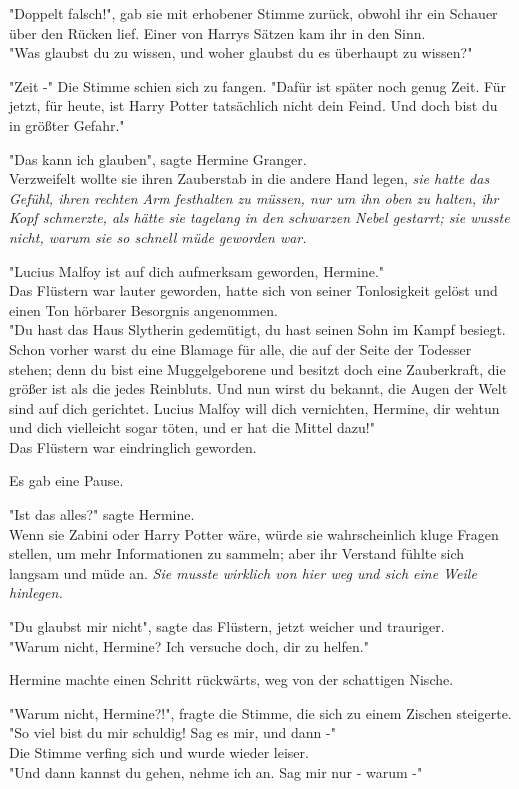 {"Doppelt falsch!", gab sie mit erhobener Stimme zurück, obwohl ihr ein Schauer über den Rücken lief. Einer von Harrys Sätzen kam ihr in den Sinn.\\ "Was glaubst du zu wissen, und woher glaubst du es überhaupt zu wissen?"

"Zeit -" Die Stimme schien sich zu fangen. "Dafür ist später noch genug Zeit. Für jetzt, für heute, ist Harry Potter tatsächlich nicht dein Feind. Und doch bist du in größter Gefahr."

"Das kann ich glauben", sagte Hermine Granger.\\ Verzweifelt wollte sie ihren Zauberstab in die andere Hand legen, \emph{sie hatte das Gefühl, ihren rechten Arm festhalten zu müssen, nur um ihn oben zu halten, ihr Kopf schmerzte, als hätte sie tagelang in den schwarzen Nebel gestarrt; sie wusste nicht, warum sie so schnell müde geworden war.}

"Lucius Malfoy ist auf dich aufmerksam geworden, Hermine."\\ Das Flüstern war lauter geworden, hatte sich von seiner Tonlosigkeit gelöst und einen Ton hörbarer Besorgnis angenommen.\\ "Du hast das Haus Slytherin gedemütigt, du hast seinen Sohn im Kampf besiegt. Schon vorher warst du eine Blamage für alle, die auf der Seite der Todesser stehen; denn du bist eine Muggelgeborene und besitzt doch eine Zauberkraft, die größer ist als die jedes Reinbluts. Und nun wirst du bekannt, die Augen der Welt sind auf dich gerichtet. Lucius Malfoy will dich vernichten, Hermine, dir wehtun und dich vielleicht sogar töten, und er hat die Mittel dazu!"\\ Das Flüstern war eindringlich geworden.

Es gab eine Pause.

"Ist das alles?" sagte Hermine.\\ Wenn sie Zabini oder Harry Potter wäre, würde sie wahrscheinlich kluge Fragen stellen, um mehr Informationen zu sammeln; aber ihr Verstand fühlte sich langsam und müde an. \emph{Sie musste wirklich von hier weg und sich eine Weile hinlegen.}

"Du glaubst mir nicht", sagte das Flüstern, jetzt weicher und trauriger.\\ "Warum nicht, Hermine? Ich versuche doch, dir zu helfen."

Hermine machte einen Schritt rückwärts, weg von der schattigen Nische.

"Warum nicht, Hermine?!", fragte die Stimme, die sich zu einem Zischen steigerte. "So viel bist du mir schuldig! Sag es mir, und dann -"\\ Die Stimme verfing sich und wurde wieder leiser.\\ "Und dann kannst du gehen, nehme ich an. Sag mir nur - warum -"

}
